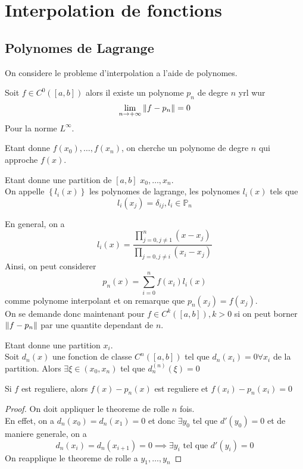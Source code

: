 \documentclass[../main.tex]{subfiles}
\begin{document}
\section{Interpolation de fonctions}
\subsection{Polynomes de Lagrange}
On considere le probleme d'interpolation a l'aide de polynomes.
\begin{thm}
	Soit $f\in C^{0}( [ a,b] ) $ alors il existe un polynome $p_n$ de degre  $n$ yrl wur
	\[ 
\lim_{n \to  + \infty} \left\lVert f-p_n\right\rVert =0		
	\]
	Pour la norme $L^{ \infty }$.
	
\end{thm}
Etant donne $f( x_0) ,\ldots, f( x_n) $, on cherche un polynome de degre $n$ qui approche $f( x) $.
\begin{defn}
	Etant donne une partition de $ [ a,b] $ $ x_0,\ldots, x_n$.\\
	On appelle $ \left\{ l_i( x)  \right\} $ les polynomes de lagrange, les polynomes $l_i( x)$ tels que 
	\[ 
		l_i( x_j) = \delta_{ij} , l_i \in \mathbb{P}_n
	\]
	
\end{defn}
En general, on a
\[ 
l_i( x) = \frac{\prod_{j=0, j\neq 1}^{n}( x-x_j) }{\prod_{j=0, j\neq i} ( x_i-x_j) 	}
\]
Ainsi, on peut considerer
\[ 
p_n( x) = \sum_{i=0}^{ n} f( x_i) l_i( x) 
\]
comme polynome interpolant et on remarque que $p_n( x_j)= f( x_j)  $.\\
On se demande donc maintenant pour $f\in C^{k}( [a,b ] ), k >0$ si on peut borner $ \left\lVert f-p_n\right\rVert $ par une quantite dependant de $n$.
\begin{propo}
	Etant donne une partition $x_i$.\\
Soit $d_n( x) $ une fonction de classe $C^{n}( [ a,b] ) $ tel que $d_n( x_i) =0 \forall x_i$ de la partition. Alors $\exists \xi \in ( x_0,x_n) $ tel que $d_n^{( n) }( \xi) =0$ 
\end{propo}
\begin{rmq}
Si  $f$ est reguliere, alors $f( x) -p_n( x) $ est reguliere et $f( x_i) -p_n( x_i) =0$ 
\end{rmq}
\begin{proof}
On doit appliquer le theoreme de rolle $n$ fois.\\
En effet, on a $d_n( x_0) = d_n( x_1) =0$ et donc $\exists y_0$ tel que $d'( y_0) =0$ et de maniere generale, on a 
\[ 
d_n( x_i) = d_n( x_{i+1} ) =0 \implies \exists y_i \text{ tel que } d'( y_i) =0
\]
On reapplique le theoreme de rolle a $y_1,\ldots, y_n$ 
\end{proof}
\end{document}
